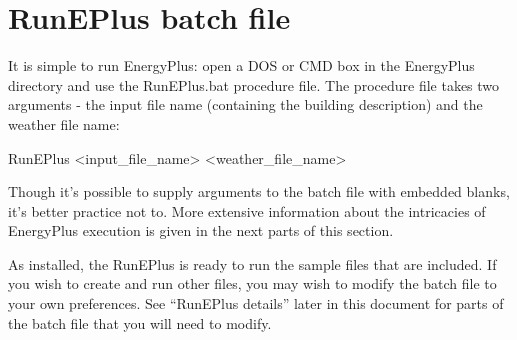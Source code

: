 \section{RunEPlus batch file}\label{runeplus-batch-file}

It is simple to run EnergyPlus: open a DOS or CMD box in the EnergyPlus directory and use the RunEPlus.bat procedure file. The procedure file takes two arguments - the input file name (containing the building description) and the weather file name:

RunEPlus \textless{}input\_file\_name\textgreater{} \textless{}weather\_file\_name\textgreater{}

Though it's possible to supply arguments to the batch file with embedded blanks, it's better practice not to. More extensive information about the intricacies of EnergyPlus execution is given in the next parts of this section.

As installed, the RunEPlus is ready to run the sample files that are included. If you wish to create and run other files, you may wish to modify the batch file to your own preferences. See ``RunEPlus details'' later in this document for parts of the batch file that you will need to modify.
